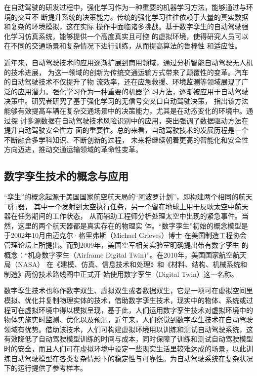 在自动驾驶的研发过程中，强化学习作为一种重要的机器学习方法，能够通过与环境的交互不
断提升系统的决策能力。传统的强化学习往往依赖于大量的真实数据和复杂的环境模拟，这在实际
操作中面临诸多挑战。基于数字孪生的自动驾驶强化学习仿真系统，能够提供一个高度真实且可控
的虚拟环境\cite{梁恩云2021基于数字孪生的自动驾驶交通场景构建研究}，使得研究人员可以在不同的交通场景和复杂情况下进行训练，从而提高算法的鲁棒性
和适应性。

近年来，自动驾驶技术的应用逐渐扩展到商用领域，通过分析智能自动驾驶无人机的技术进展，
为这一领域的创新为传统交通运输方式带来了颠覆性的变革\cite{方韶剑2024基于深度学习的智能自动驾驶无人机技术分析}。汽车的自动驾驶技术不仅提升了物
流效率，还在应急救援、环境监测等领域展现了广泛的应用潜力。强化学习作为一种重要的机器学
习方法，逐渐被应用于自动驾驶决策中。研究者研究了基于强化学习的无信号交叉口自动驾驶决策\cite{李文娜2024自动驾驶汽车闯红灯预警数字孪生道路测试}，
指出该方法能够有效提高车辆在复杂交通场景中的决策能力，尤其是在动态变化的环境中。通过探
讨多源数据在自动驾驶技术风险识别中的应用，突出强调了数据驱动方法在提升自动驾驶安全性方
面的重要性。总的来看，自动驾驶技术的发展历程是一个不断融合多学科知识、不断创新的过程，
未来将继续朝着更高的智能化和安全性方向迈进，推动交通运输领域的革命性变革。







\subsection{数字孪生技术的概念与应用}

“孪生”的概念起源于美国国家航空航天局的“阿波罗计划”，即构建两个相同的航天飞行器，
其中一个发射到太空执行任务，另一个留在地球上用于反映太空中航天器在任务期间的工作状态，
从而辅助工程师分析处理太空中出现的紧急事件。当然，这里的两个航天器都是真实存在的物理实
体。“数字孪生”初始的概念模型是于2002年10月由迈克尔·格里弗斯（Michael Grieves）博士
在美国制造工程协会管理论坛上所提出。而到2009年，美国空军相关实验室明确提出带有数字孪生
的概念：“机身数字孪生（Airframe Digital Twin)”。在2010年，美国国家航空航天局（NASA）
在《建模、仿真、信息技术和处理》和《材料、结构、机械系统和制造》两份技术路线图中正式开
始使用数字孪生（Digital Twin）这一名称。


数字孪生技术也称作数字双生、虚拟双生或者数据双生，它是一项可在虚拟空间里模拟、优化并复制物理实体的技术，借助数字孪生技术，现实中的物体、系统或过程可在虚拟环境中得以模拟呈现，基于此，人们运用数字孪生技术对虚拟环境中的物体实施实时监测、优化以及预测，近年来，人们察觉到数字孪生技术在自动驾驶领域有优势\cite{王庆涛2021数字孪生技术在自动驾驶测试领域的应用研究概述}。借助该技术，人们可构建虚拟环境用以训练和测试自动驾驶系统，这有效降低了自动驾驶模型训练的时间与成本，同时保障了训练和测试自动驾驶模型时的安全\cite{葛雨明2020基于数字孪生的网联自动驾驶测试方法研究}，而且人们可在虚拟环境中设定一些现实生活里较难达成的场景，以此训练自动驾驶模型在各类复杂情形下的稳定性与可靠性。为自动驾驶系统在复杂状况下的运行提供了参考样本。

